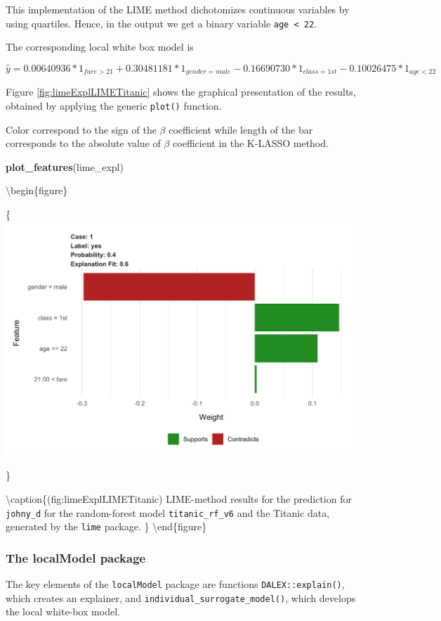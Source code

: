 \documentclass[12pt,]{krantz}
\newenvironment{Shaded}{\begin{snugshade}}{\end{snugshade}}
\newcommand{\KeywordTok}[1]{\textcolor[rgb]{0.13,0.29,0.53}{\textbf{#1}}}
\newcommand{\NormalTok}[1]{#1}
\begin{document}
This implementation of the LIME method dichotomizes continuous variables by using quartiles. Hence, in the output we get a binary variable \texttt{age\ \textless{}\ 22}.

The corresponding local white box model is

\[
\hat y = 0.00640936 * 1_{fare > 21} + 0.30481181 * 1_{gender = male} - 
0.16690730 * 1_{class = 1st} -0.10026475 * 1_{age < 22}
\]

Figure \ref{fig:limeExplLIMETitanic} shows the graphical presentation of the results, obtained by applying the generic \texttt{plot()} function.

Color correspond to the sign of the \(\beta\) coefficient while length of the bar corresponds to the absolute value of \(\beta\) coefficient in the K-LASSO method.

\begin{Shaded}
\begin{Highlighting}[]
\KeywordTok{plot_features}\NormalTok{(lime_expl)}
\end{Highlighting}
\end{Shaded}

\textbackslash{}begin\{figure\}

\{\centering \includegraphics[width=0.6\linewidth]{figure/lime_expl_lime_titanic}

\}

\textbackslash{}caption\{(fig:limeExplLIMETitanic) LIME-method results for the prediction for \texttt{johny\_d} for the random-forest model \texttt{titanic\_rf\_v6} and the Titanic data, generated by the \texttt{lime} package. \}\label{fig:limeExplLIMETitanic}
\textbackslash{}end\{figure\}

\hypertarget{the-localmodel-package}{%
\subsubsection{The localModel package}\label{the-localmodel-package}}

The key elements of the \texttt{localModel} package are functions \texttt{DALEX::explain()}, which creates an explainer, and \texttt{individual\_surrogate\_model()}, which develops the local white-box model.
\end{document}
